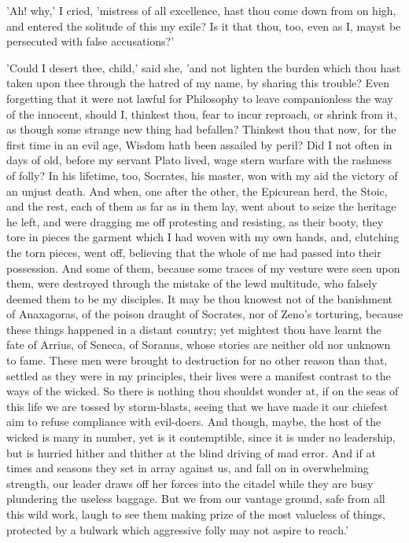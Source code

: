 'Ah! why,' I cried, 'mistress of all excellence, hast thou come down
from on high, and entered the solitude of this my exile? Is it that
thou, too, even as I, mayst be persecuted with false accusations?'

'Could I desert thee, child,' said she, 'and not lighten the burden
which thou hast taken upon thee through the hatred of my name, by
sharing this trouble? Even forgetting that it were not lawful for
Philosophy to leave companionless the way of the innocent, should I,
thinkest thou, fear to incur reproach, or shrink from it, as though
some strange new thing had befallen? Thinkest thou that now, for the
first time in an evil age, Wisdom hath been assailed by peril? Did I not
often in days of old, before my servant Plato lived, wage stern warfare
with the rashness of folly? In his lifetime, too, Socrates, his master,
won with my aid the victory of an unjust death. And when, one after the
other, the Epicurean herd, the Stoic, and the rest, each of them as far
as in them lay, went about to seize the heritage he left, and were
dragging me off protesting and resisting, as their booty, they tore in
pieces the garment which I had woven with my own hands, and, clutching
the torn pieces, went off, believing that the whole of me had passed
into their possession. And some of them, because some traces of my
vesture were seen upon them, were destroyed through the mistake of the
lewd multitude, who falsely deemed them to be my disciples. It may be
thou knowest not of the banishment of Anaxagoras, of the poison draught
of Socrates, nor of Zeno's torturing, because these things happened in
a distant country; yet mightest thou have learnt the fate of Arrius, of
Seneca, of Soranus, whose stories are neither old nor unknown to fame.
These men were brought to destruction for no other reason than that,
settled as they were in my principles, their lives were a manifest
contrast to the ways of the wicked. So there is nothing thou shouldst
wonder at, if on the seas of this life we are tossed by storm-blasts,
seeing that we have made it our chiefest aim to refuse compliance with
evil-doers. And though, maybe, the host of the wicked is many in number,
yet is it contemptible, since it is under no leadership, but is hurried
hither and thither at the blind driving of mad error. And if at times
and seasons they set in array against us, and fall on in overwhelming
strength, our leader draws off her forces into the citadel while they
are busy plundering the useless baggage. But we from our vantage ground,
safe from all this wild work, laugh to see them making prize of the most
valueless of things, protected by a bulwark which aggressive folly may
not aspire to reach.'

